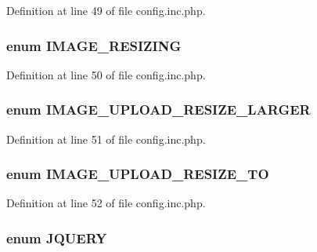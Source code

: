 Definition at line 49 of file config.inc.php.

\hypertarget{config_8inc_8php_a0654894e46ca07417a6e85e091ed7d1d}{
\subsubsection[{IMAGE\_\-RESIZING}]{\setlength{\rightskip}{0pt plus 5cm}enum {\bf IMAGE\_\-RESIZING}}}
\label{config_8inc_8php_a0654894e46ca07417a6e85e091ed7d1d}


Definition at line 50 of file config.inc.php.

\hypertarget{config_8inc_8php_a009a803b2fcec74eb8fd6b90dfebd680}{
\subsubsection[{IMAGE\_\-UPLOAD\_\-RESIZE\_\-LARGER}]{\setlength{\rightskip}{0pt plus 5cm}enum {\bf IMAGE\_\-UPLOAD\_\-RESIZE\_\-LARGER}}}
\label{config_8inc_8php_a009a803b2fcec74eb8fd6b90dfebd680}


Definition at line 51 of file config.inc.php.

\hypertarget{config_8inc_8php_a86484d4f8051155268e7c23ac4d1f5f4}{
\subsubsection[{IMAGE\_\-UPLOAD\_\-RESIZE\_\-TO}]{\setlength{\rightskip}{0pt plus 5cm}enum {\bf IMAGE\_\-UPLOAD\_\-RESIZE\_\-TO}}}
\label{config_8inc_8php_a86484d4f8051155268e7c23ac4d1f5f4}


Definition at line 52 of file config.inc.php.

\hypertarget{config_8inc_8php_a5c2fff7e41a0380fb7872627e3a14a29}{
\subsubsection[{JQUERY}]{\setlength{\rightskip}{0pt plus 5cm}enum {\bf JQUERY}}}
\label{config_8inc_8php_a5c2fff7e41a0380fb7872627e3a14a29}



